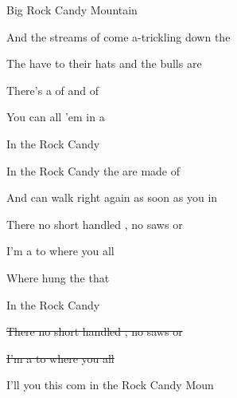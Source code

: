 \begin{SBSong}{Big Rock Candy Mountain}
\begin{SBVerse}
    And the  streams of  come a-trickling down the 
    
    The  have to  their hats and the  bulls are 
    
    There's a  of  and of  
    
    You can  all  'em in a  
    
    In the  Rock Candy 
  \end{SBVerse}
  \CBPageBrk
  \begin{SBVerse}
    In the  Rock Candy  the  are made of 
    
    And  can walk right  again as soon as you  in
    
    There  no short handled , no  saws or 
    
    I'm a  to  where you  all  
    
    Where  hung the  that  
    
    In the  Rock Candy 
  \end{SBVerse}
  \begin{SBVerse}
  
    \sout{There  no short handled , no  saws or }
    
    \sout{I'm a  to  where you  all }
  
    I'll  you  
    this com  
    in the  Rock Candy Moun
  \end{SBVerse}
\end{SBSong}
